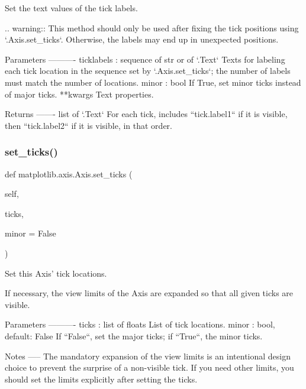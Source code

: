 \begin{DoxyVerb}Set the text values of the tick labels.

.. warning::
    This method should only be used after fixing the tick positions
    using `.Axis.set_ticks`. Otherwise, the labels may end up in
    unexpected positions.

Parameters
----------
ticklabels : sequence of str or of `.Text`\s
    Texts for labeling each tick location in the sequence set by
    `.Axis.set_ticks`; the number of labels must match the number of
    locations.
minor : bool
    If True, set minor ticks instead of major ticks.
**kwargs
    Text properties.

Returns
-------
list of `.Text`\s
    For each tick, includes ``tick.label1`` if it is visible, then
    ``tick.label2`` if it is visible, in that order.
\end{DoxyVerb}
 \mbox{\label{classmatplotlib_1_1axis_1_1Axis_a255ffd4e4c5ab47df42115b519a1c4f4}} 
\subsubsection{\texorpdfstring{set\+\_\+ticks()}{set\_ticks()}}
{\footnotesize\ttfamily def matplotlib.\+axis.\+Axis.\+set\+\_\+ticks (\begin{DoxyParamCaption}\item[{}]{self,  }\item[{}]{ticks,  }\item[{}]{minor = {\ttfamily False} }\end{DoxyParamCaption})}

\begin{DoxyVerb}Set this Axis' tick locations.

If necessary, the view limits of the Axis are expanded so that all
given ticks are visible.

Parameters
----------
ticks : list of floats
    List of tick locations.
minor : bool, default: False
    If ``False``, set the major ticks; if ``True``, the minor ticks.

Notes
-----
The mandatory expansion of the view limits is an intentional design
choice to prevent the surprise of a non-visible tick. If you need
other limits, you should set the limits explicitly after setting the
ticks.
\end{DoxyVerb}
 \mbox{\label{classmatplotlib_1_1axis_1_1Axis_a84cf0815055acf98bfc3e5b7c73e2e63}} 

